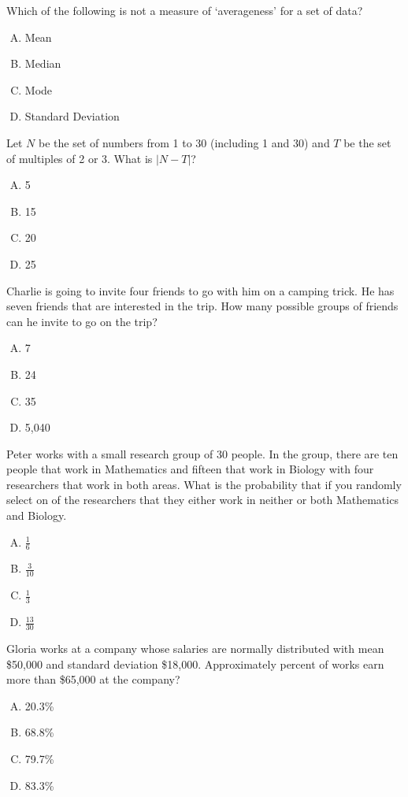 \documentclass[12pt,letterpaper]{exam}
\begin{document}
\begin{questions}
\vfill

\question Which of the following is not a measure of `averageness' for a set of data?
	\begin{enumerate}[A.]
	\item Mean
	\item Median
	\item Mode
	\item Standard Deviation
	\end{enumerate}

\vfill

\question Let $N$ be the set of numbers from 1 to 30 (including 1 and 30) and $T$ be the set of multiples of 2 or 3. What is $|N - T|$?
	\begin{enumerate}[A.]
	\item 5
	\item 15
	\item 20
	\item 25
	\end{enumerate}

\vfill

\question Charlie is going to invite four friends to go with him on a camping trick. He has seven friends that are interested in the trip. How many possible groups of friends can he invite to go on the trip?
	\begin{enumerate}[A.]
	\item 7
	\item 24
	\item 35
	\item 5,040
	\end{enumerate}

\vfill

\question Peter works with a small research group of 30 people. In the group, there are ten people that work in Mathematics and fifteen that work in Biology with four researchers that work in both areas. What is the probability that if you randomly select on of the researchers that they either work in neither or both Mathematics and Biology.
	\begin{enumerate}[A.]
	\item $\frac{1}{6}$
	\item $\frac{3}{10}$
	\item $\frac{1}{3}$
	\item $\frac{13}{30}$
	\end{enumerate}

\vfill

\question Gloria works at a company whose salaries are normally distributed with mean \$50,000 and standard deviation \$18,000. Approximately percent of works earn more than \$65,000 at the company?
	\begin{enumerate}[A.]
	\item 20.3\%
	\item 68.8\%
	\item 79.7\%
	\item 83.3\%
	\end{enumerate}


\end{questions}
\end{document}
